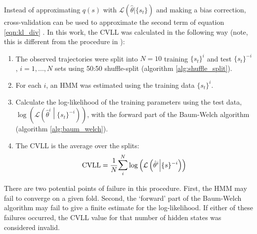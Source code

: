 Instead of approximating $q(s)$ with $\mathcal{L}\left(\hat{\theta}|\{s_t\}\right)$ and making a bias correction, cross-validation can be used to approximate the second term of equation \ref{eqn:kl_div} \cite{celeuxSelectingHiddenMarkov2008}. In this work, the CVLL was calculated in the following way (note, this is different from the procedure in \cite{celeuxSelectingHiddenMarkov2008}): 
\begin{enumerate}
    \item The observed trajectories were split into $N = 10$ training $\{s_t\}^{i}$ and test $\{s_t\}^{-i}$, $i = 1, ..., N$ sets using 50:50 shuffle-split (algorithm \ref{alg:shuffle_split}). 
    \item For each $i$, an HMM was estimated using the training data $\{s_t\}^{i}$. 
    \item Calculate the log-likelihood of the training parameters using the test data,  $\log{\left(\mathcal{L}\left(\hat{\theta}^{i}\middle|\{s_t\}^{-i}\right)\right)}$, with the forward part of the Baum-Welch algorithm (algorithm \ref{alg:baum_welch}). 
    \item The CVLL is the average over the splits: 
    \begin{equation}
        \operatorname{CVLL} = \frac{1}{N}\mathlarger{\sum}_{i}^{N}\log{\left(\mathcal{L}\left(\hat{\theta}^{i} \middle | \{s\}^{-i}\right)\right)}
    \end{equation}
\end{enumerate}
There are two potential points of failure in this procedure. First, the HMM may fail to converge on a given fold. Second, the `forward' part of the Baum-Welch algorithm may fail to give a finite estimate for the log-likelihood. If either of these failures occurred, the CVLL value for that number of hidden states was considered invalid. 

